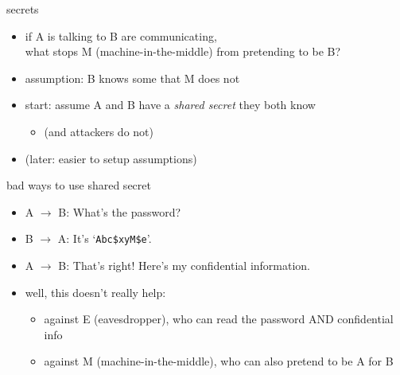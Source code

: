 \begin{frame}{secrets}
    \begin{itemize}
    \item if A is talking to B are communicating, \\
        what stops M (machine-in-the-middle) from pretending to be B?
    \vspace{.5cm}
    \item assumption: B knows some  that M does not
    \vspace{.5cm}
    \item<2-> start: assume A and B have a \textit{shared secret} they both know
        \begin{itemize}
        \item (and attackers do not)
        \end{itemize}
    \item<2-> (later: easier to setup assumptions)
    \end{itemize}
\end{frame}

\begin{frame}{bad ways to use shared secret}
    \begin{itemize}
    \item A $\rightarrow$ B: What's the password?
    \item B $\rightarrow$ A: It's `\texttt{Abc\$xyM\$e}'.
    \item A $\rightarrow$ B: That's right! Here's my confidential information.
    \vspace{.5cm}
    \item<2-> well, this doesn't really help: 
        \begin{itemize}
        \item against E (eavesdropper), who can read the password AND confidential info
        \item against M (machine-in-the-middle), who can also pretend to be A for B
        \end{itemize}
    \end{itemize}
\end{frame}

